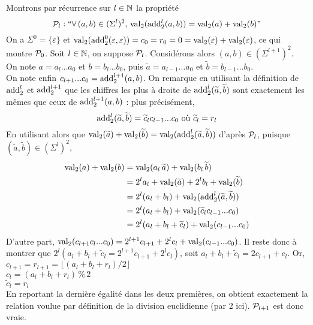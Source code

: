 			\eqskip{3mm}
			\begin{Preuve}
				Montrons par récurrence sur \(l\in\bb{N}\) la propriété
					\[
						\cal{P}_l : \text{``}\forall\,(a,b)\in(\Sigma^l)^2,\,\val_2(\add_2^l(a,b)) = \val_2(a)+\val_2(b)\text{''}
					\]
				\bdot On a \(\Sigma^0 = \{\varepsilon\}\) et \(\val_2(\add_2^0(\varepsilon,\varepsilon)) = c_0 = r_0 = 0 = \val_2(\varepsilon) + \val_2(\varepsilon)\), ce qui montre \(\cal{P}_0\). \nt
				\bdot Soit \(l\in\bb{N}\), on suppose \(\cal{P}_l\). Considérons alors \((a,b)\in(\Sigma^{l+1})^2\). \\
				On note \(a = a_{l}...a_0\) et \(b=b_l...b_0\), puis \(\widetilde{a} = a_{l-1}...a_0\) et \(\widetilde{b} = b_{l-1}...b_0\). \\
				On note enfin \(c_{l+1}...c_0 = \add_2^{l+1}(a,b)\). \nt
				\eqskip{2mm}
				On remarque en utilisant la définition de \(\add_2^{l}\) et \(\add_2^{l+1}\) que les chiffres les plus à droite de \(\add_2^l(\widetilde{a},\widetilde{b})\) sont exactement les mêmes que ceux de \(\add_2^{l+1}(a,b)\) : plus précisément,
					\[
						\add_2^l(\widetilde{a},\widetilde{b}) = \widetilde{c}_lc_{l-1}...c_0 \text{ où } \widetilde{c}_l = r_l
					\]
				En utilisant alors que \(\val_2(\widetilde{a}) + \val_2(\widetilde{b}) = \val_2(\add_2^l(\widetilde{a},\widetilde{b}))\) d'après \(\cal{P}_l\), puisque \((\widetilde{a},\widetilde{b})\in(\Sigma^l)^2\), \eqskip{3mm}
					\begin{align*}
						\val_2(a) + \val_2(b) & = \val_2(a_l\,\widetilde{a}) + \val_2(b_l\,\widetilde{b}) \\
						& = 2^la_l+\val_2(\widetilde{a}) + 2^lb_l+\val_2(\widetilde{b}) \\
						& = 2^l(a_l+b_l) + \val_2(\add_2^l(\widetilde{a},\widetilde{b})) \\
						& = 2^l(a_l+b_l) + \val_2(\widetilde{c}_lc_{l-1}...c_0)	\\
						& = 2^l(a_l+b_l+\widetilde{c}_l) + \val_2(c_{l-1}...c_0)
					\end{align*}
				D'autre part, \(\val_2(c_{l+1}c_l...c_0) = 2^{l+1}c_{l+1} + 2^lc_l + \val_2(c_{l-1}...c_0)\). \nt
				Il reste donc à montrer que \(2^l(a_l+b_l+\widetilde{c}_l = 2^{l+1}c_{l+1}+2^lc_l)\), soit \(a_l+b_l+\widetilde{c}_l = 2c_{l+1} + c_l\). Or, \\
					 \bdot \(c_{l+1} = r_{l+1} = \lfloor (a_l+b_l+r_l)/2 \rfloor\) \\
					 \bdot \(c_l = (a_l+b_l+r_l) \,\%\, 2\) \\
					 \bdot \(\widetilde{c}_l = r_l\) \\
				En reportant la dernière égalité dans les deux premières, on obtient exactement la relation voulue par définition de la division euclidienne (par 2 ici). \(\cal{P}_{l+1}\) est donc vraie.
			\end{Preuve}
			
